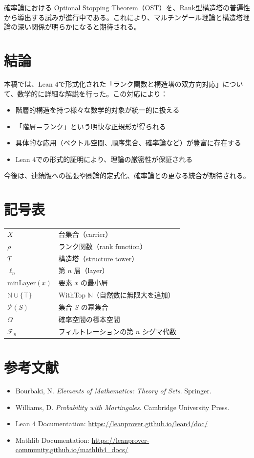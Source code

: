 \documentclass[a4paper,11pt]{ltjsarticle}
\theoremstyle{definition}
\begin{document}
確率論における Optional Stopping Theorem（OST）を、Rank型構造塔の普遍性から導出する試みが進行中である。これにより、マルチンゲール理論と構造塔理論の深い関係が明らかになると期待される。

\section{結論}

本稿では、Lean 4で形式化された「ランク関数と構造塔の双方向対応」について、数学的に詳細な解説を行った。この対応により：

\begin{itemize}
\item 階層的構造を持つ様々な数学的対象が統一的に扱える
\item 「階層＝ランク」という明快な正規形が得られる
\item 具体的な応用（ベクトル空間、順序集合、確率論など）が豊富に存在する
\item Lean 4での形式的証明により、理論の厳密性が保証される
\end{itemize}

今後は、連続版への拡張や圏論的定式化、確率論との更なる統合が期待される。

\appendix

\section{記号表}

\begin{tabular}{ll}
$X$ & 台集合（carrier） \\
$\rho$ & ランク関数（rank function） \\
$T$ & 構造塔（structure tower） \\
$\ell_n$ & 第 $n$ 層（layer） \\
$\mathrm{minLayer}(x)$ & 要素 $x$ の最小層 \\
$\mathbb{N} \cup \{\top\}$ & WithTop $\mathbb{N}$（自然数に無限大を追加） \\
$\mathcal{P}(S)$ & 集合 $S$ の冪集合 \\
$\Omega$ & 確率空間の標本空間 \\
$\mathcal{F}_n$ & フィルトレーションの第 $n$ シグマ代数 \\
\end{tabular}

\section{参考文献}

\begin{itemize}
\item Bourbaki, N. \textit{Elements of Mathematics: Theory of Sets}. Springer.
\item Williams, D. \textit{Probability with Martingales}. Cambridge University Press.
\item Lean 4 Documentation: \url{https://leanprover.github.io/lean4/doc/}
\item Mathlib Documentation: \url{https://leanprover-community.github.io/mathlib4_docs/}
\end{itemize}
\end{document}
